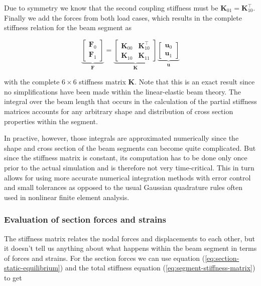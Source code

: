 Due to symmetry we know that the second coupling stiffness must be $\boldsymbol{K}_{01} = \boldsymbol{K}_{10}^\intercal$.
Finally we add the forces from both load cases, which results in the complete stiffness relation for the beam segment as

\begin{equation}
\underbrace{
\begin{bmatrix}
\boldsymbol{F}_0 \\ \boldsymbol{F}_1
\end{bmatrix}
}_{\boldsymbol{F}}
=
\underbrace{
\begin{bmatrix}
\boldsymbol{K}_{00} & \boldsymbol{K}_{10}^\intercal \\
\boldsymbol{K}_{10} & \boldsymbol{K}_{11}
\end{bmatrix}
}_{\boldsymbol{K}}
\underbrace{
\begin{bmatrix}
\boldsymbol{u}_0 \\ \boldsymbol{u}_1
\end{bmatrix}
}_{\boldsymbol{u}} \label{eq:segment-stiffness-matrix}
\end{equation}

with the complete $6 \times 6$ stiffness matrix $\boldsymbol{K}$.
Note that this is an exact result since no simplifications have been made within the linear-elastic beam theory.
The integral over the beam length that occurs in the calculation of the partial stiffness matrices accounts for any arbitrary shape and distribution of cross section properties within the segment.

In practive, however, those integrals are approximated numerically since the shape and cross section of the beam segments can become quite complicated.
But since the stiffness matrix is constant, its computation has to be done only once prior to the actual simulation and is therefore not very time-critical.
This in turn allows for using more accurate numerical integration methods with error control and small tolerances as opposed to the usual Gaussian quadrature rules often used in nonlinear finite element analysis.

\subsubsection*{Evaluation of section forces and strains}

The stiffness matrix relates the nodal forces and displacements to each other, but it doesn't tell us anything about what happens within the beam segment in terms of forces and strains.
For the section forces we can use equation (\ref{eq:section-static-equilibrium}) and the total stiffness equation (\ref{eq:segment-stiffness-matrix}) to get

